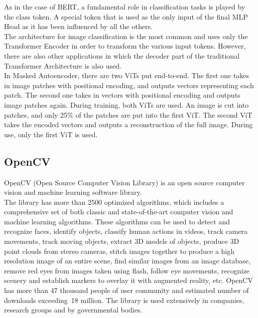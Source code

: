 As in the case of BERT, a fundamental role in classification tasks is played by the class token. A special token that is used as the only input of the final MLP Head as it has been influenced by all the others.
\\

The architecture for image classification is the most common and uses only the Transformer Encoder in order to transform the various input tokens. However, there are also other applications in which the decoder part of the traditional Transformer Architecture is also used.
\\

In Masked Autoencoder, there are two ViTs put end-to-end. The first one takes in image patches with positional encoding, and outputs vectors representing each patch. The second one takes in vectors with positional encoding and outputs image patches again. During training, both ViTs are used. An image is cut into patches, and only 25\% of the patches are put into the first ViT. The second ViT takes the encoded vectors and outputs a reconstruction of the full image. During use, only the first ViT is used.
\\

\subsection{\textbf{OpenCV}}
\cite{opencv} OpenCV (Open Source Computer Vision Library) is an open source computer vision and machine learning software library.
\\

The library has more than 2500 optimized algorithms, which includes a comprehensive set of both classic and state-of-the-art computer vision and machine learning algorithms. These algorithms can be used to detect and recognize faces, identify objects, classify human actions in videos, track camera movements, track moving objects, extract 3D models of objects, produce 3D point clouds from stereo cameras, stitch images together to produce a high resolution image of an entire scene, find similar images from an image database, remove red eyes from images taken using flash, follow eye movements, recognize scenery and establish markers to overlay it with augmented reality, etc. OpenCV has more than 47 thousand people of user community and estimated number of downloads exceeding 18 million. The library is used extensively in companies, research groups and by governmental bodies.
\\

